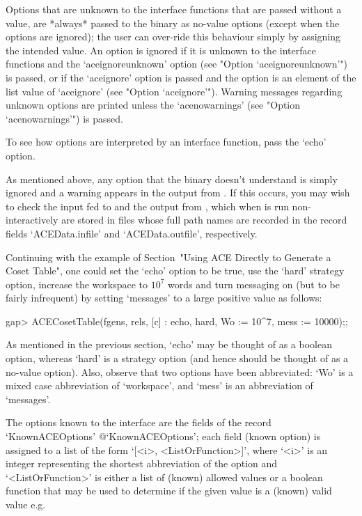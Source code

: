 Options that are unknown to the {\ACE} interface  functions  that  are
passed without a value, are *always* passed to the  {\ACE}  binary  as
no-value options (except when the options are ignored); the  user  can
over-ride this behaviour simply by assigning the  intended  value.  An
option is ignored if it is unknown to the {\ACE}  interface  functions
and the `aceignoreunknown' option (see "Option `aceignoreunknown'") is
passed, or if the `aceignore' option is passed and the  option  is  an
element of the list value of `aceignore' (see  "Option  `aceignore'").
Warning messages regarding unknown  options  are  printed  unless  the
`acenowarnings' (see "Option `acenowarnings'") is passed.

To see how options are interpreted by an  {\ACE}  interface  function,
pass the `echo' option.

As  mentioned  above,  any  option  that  the  {\ACE}  binary  doesn't
understand is simply ignored and a warning appears in the output  from
{\ACE}. If this occurs, you may wish to check the input fed to  {\ACE}
and the output from {\ACE}, which when {\ACE} is run non-interactively
are stored in files whose full path names are recorded in  the  record
fields `ACEData.infile' and `ACEData.outfile', respectively.


Continuing with the example of Section~"Using ACE Directly to Generate
a Coset Table", one could set the `echo' option to be  true,  use  the
`hard' strategy option, increase the workspace  to  $10^7$  words  and
turn messaging on (but to be fairly infrequent) by setting  `messages'
to a large positive value as follows:

\beginexample
gap> ACECosetTable(fgens, rels, [c] : echo, hard, Wo := 10^7, mess := 10000);;
\endexample

As mentioned in the previous section, `echo' may be thought  of  as  a
boolean option, whereas `hard' is a strategy option (and hence  should
be thought of as a no-value option). Also, observe  that  two  options
have  been  abbreviated:  `Wo'  is  a  mixed  case   abbreviation   of
`workspace', and `mess' is an abbreviation of `messages'.


The {\ACE} options known to the {\ACE} interface are the fields of the
record          `KnownACEOptions'{\undoquotes{}
{@`KnownACEOptions'}}; each field (known {\ACE} option) is assigned to
a list of the  form  `[<i>,  <ListOrFunction>]',  where  `<i>'  is  an
integer representing the  shortest  abbreviation  of  the  option  and
`<ListOrFunction>' is either a list of (known)  allowed  values  or  a
boolean function that may be used to determine if the given value is a
(known) valid value e.g.

